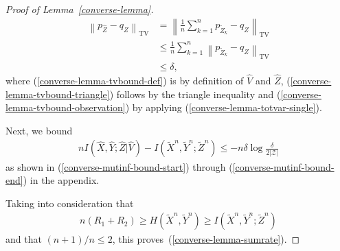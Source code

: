 \documentclass[journal]{IEEEtran}
\newcommand{\lemmaconst}{\delta}
\newcommand{\channelpmf}{q}
\newcommand{\codebookpmf}{p}
\newcommand{\codebookRateOne}{R_1}
\newcommand{\codebookRateTwo}{R_2}
\newcommand{\channelInOne}{X}
\newcommand{\channelInTwo}{Y}
\newcommand{\channelOut}{Z}
\newcommand{\channelOutAlph}{\mathcal{Z}}
\newcommand{\codebookBlocklength}{n}
\newcommand{\blockIndex}{k}
\newcommand{\mutualInformation}[2]{I(#1;#2)}
\newcommand{\mutualInformationConditional}[3]{I(#1;#2|#3)}
\newcommand{\entropy}[1]{H(#1)}
\newcommand{\totalvariationlr}[1]{\left\lVert #1 \right\rVert_\mathrm{TV}}
\newcommand{\cardinality}[1]{\lvert #1 \rvert}
\newcommand{\timeSharingRV}{V}
\begin{document}
\begin{proof}[Proof of Lemma~\ref{converse-lemma}]
\begin{align}
\totalvariationlr{\codebookpmf_{\hat{\channelOut}} - \channelpmf_{\channelOut}}
&=
\totalvariationlr{
  \frac{1}{\codebookBlocklength}
  \sum\limits_{\blockIndex=1}^\codebookBlocklength
  \codebookpmf_{\tilde{\channelOut}_\blockIndex}
  -
  \channelpmf_{\channelOut}
}
\\
\label{converse-lemma-tvbound-triangle}
&\leq
\frac{1}{\codebookBlocklength}
\sum\limits_{\blockIndex=1}^\codebookBlocklength
  \totalvariationlr{
    \codebookpmf_{\tilde{\channelOut}_\blockIndex}
    -
    \channelpmf_{\channelOut}
  }
\\
\label{converse-lemma-tvbound-observation}
&\leq
\lemmaconst,
\end{align}
where (\ref{converse-lemma-tvbound-def}) is by definition of $\hat{\timeSharingRV}$ and $\hat{\channelOut}$, (\ref{converse-lemma-tvbound-triangle}) follows by the triangle inequality and (\ref{converse-lemma-tvbound-observation}) by applying (\ref{converse-lemma-totvar-single}).

Next, we bound
\begin{align}
\label{converse-mutinf-bound}
\codebookBlocklength
\mutualInformationConditional{\hat{\channelInOne}, \hat{\channelInTwo}}{\hat{\channelOut}}{\hat{\timeSharingRV}}
-
\mutualInformation{\tilde{\channelInOne}^\codebookBlocklength, \tilde{\channelInTwo}^\codebookBlocklength}{\tilde{\channelOut}^\codebookBlocklength}
\leq
-
\codebookBlocklength
\lemmaconst
\log
\frac{\lemmaconst}{2\cardinality{\channelOutAlph}}
\end{align}
as shown in (\ref{converse-mutinf-bound-start}) through (\ref{converse-mutinf-bound-end}) in the appendix.

Taking into consideration that
\begin{align*}
\codebookBlocklength
(\codebookRateOne + \codebookRateTwo)
\geq
\entropy{\tilde{\channelInOne}^\codebookBlocklength, \tilde{\channelInTwo}^\codebookBlocklength}
\geq
\mutualInformation{\tilde{\channelInOne}^\codebookBlocklength, \tilde{\channelInTwo}^\codebookBlocklength}{\tilde{\channelOut}^\codebookBlocklength}
\end{align*}
and that $(\codebookBlocklength+1)/\codebookBlocklength \leq 2$, this proves~(\ref{converse-lemma-sumrate}).


\end{proof}
\end{document}
